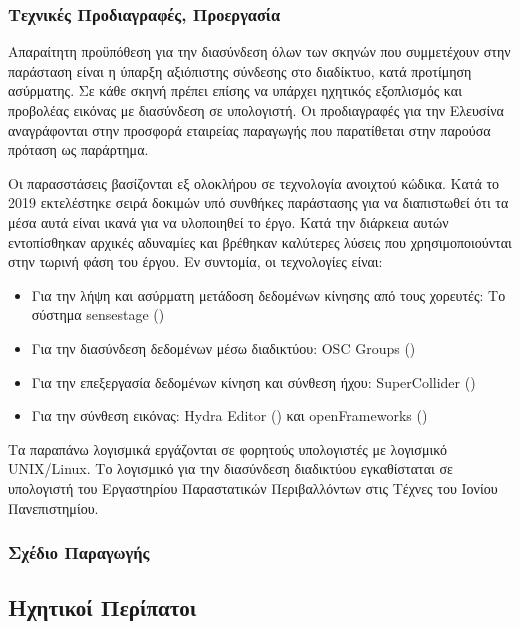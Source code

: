 \subsubsection{Τεχνικές Προδιαγραφές, Προεργασία}
\label{sec:org18d3cb2}

Απαραίτητη προϋπόθεση για την διασύνδεση όλων των σκηνών που συμμετέχουν στην παράσταση είναι η ύπαρξη αξιόπιστης σύνδεσης στο διαδίκτυο, κατά προτίμηση ασύρματης. 
Σε κάθε σκηνή πρέπει επίσης να υπάρχει ηχητικός εξοπλισμός και προβολέας εικόνας με διασύνδεση σε υπολογιστή.  Οι προδιαγραφές για την Ελευσίνα αναγράφονται στην προσφορά εταιρείας παραγωγής που παρατίθεται στην παρούσα πρόταση ως παράρτημα. 

Οι παρασστάσεις βασίζονται εξ ολοκλήρου σε τεχνολογία ανοιχτού κώδικα.  Κατά το 2019 εκτελέστηκε σειρά δοκιμών υπό συνθήκες παράστασης για να διαπιστωθεί ότι τα μέσα αυτά είναι ικανά για να υλοποιηθεί το έργο.  Κατά την διάρκεια αυτών εντοπίσθηκαν αρχικές αδυναμίες και βρέθηκαν καλύτερες λύσεις που χρησιμοποιούνται στην τωρινή φάση του έργου.  Εν συντομία, οι τεχνολογίες είναι:

\begin{itemize}
\item Για την λήψη και ασύρματη μετάδοση δεδομένων κίνησης από τους χορευτές: Το σύστημα sensestage ()
\item Για την διασύνδεση δεδομένων μέσω διαδικτύου: OSC Groups ()
\item Για την επεξεργασία δεδομένων κίνηση και σύνθεση ήχου: SuperCollider ()
\item Για την σύνθεση εικόνας: Hydra Editor () και openFrameworks ()
\end{itemize}

Τα παραπάνω λογισμικά εργάζονται σε φορητούς υπολογιστές με λογισμικό UNIX/Linux.  Το λογισμικό για την διασύνδεση διαδικτύου εγκαθίσταται σε υπολογιστή του Εργαστηρίου Παραστατικών Περιβαλλόντων στις Τέχνες του Ιονίου Πανεπιστημίου.  

\subsubsection{Σχέδιο Παραγωγής}
\label{sec:org1017cb0}

\subsection{Ηχητικοί Περίπατοι}
\label{sec:org37ec07f}

